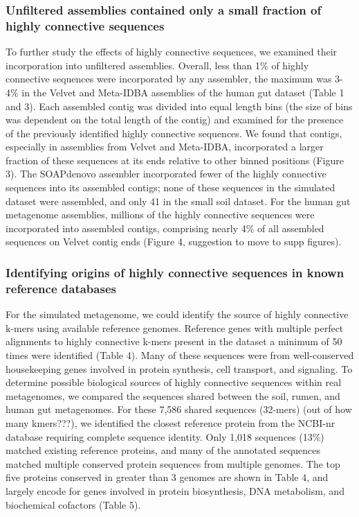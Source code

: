 \documentclass[10pt]{article}
\begin{document}
\subsubsection*{Unfiltered assemblies contained only a small fraction of highly connective sequences}
To further study the effects of highly connective sequences, we examined their incorporation into unfiltered assemblies.   Overall, less than 1\% of highly connective sequences were incorporated by any assembler, the maximum was 3-4\% in the Velvet and Meta-IDBA assemblies of the human gut dataset (Table 1 and 3).  Each assembled contig was divided into equal length bins (the size of bins was dependent on the total length of the contig) and examined for the presence of the previously identified highly connective sequences.  We found that contigs, especially in assemblies from Velvet and Meta-IDBA, incorporated a larger fraction of these sequences at its ends relative to other binned positions (Figure 3).  The SOAPdenovo assembler incorporated fewer of the highly connective sequences into its assembled contigs; none of these sequences in the simulated dataset were assembled, and only 41 in the small soil dataset.  For the human gut metagenome assemblies, millions of the highly connective sequences were incorporated into assembled contigs, comprising nearly 4\% of all assembled sequences on Velvet contig ends (Figure 4, suggestion to move to supp figures).

\subsubsection*{Identifying origins of highly connective sequences in known reference databases}

For the simulated metagenome, we could identify the source of highly connective k-mers using available reference genomes. Reference genes with multiple perfect alignments to highly connective k-mers present in the dataset a minimum of 50 times were identified (Table 4).  Many of these sequences were from well-conserved housekeeping genes involved in protein synthesis, cell transport, and signaling.  To determine possible biological sources of highly connective sequences within real metagenomes, we compared the sequences shared between the soil, rumen, and human gut metagenomes.  For these 7,586 shared sequences (32-mers) (out of how many kmers???), we identified the closest reference protein from the NCBI-nr database requiring complete sequence identity.  Only 1,018 sequences (13\%) matched existing reference proteins, and many of the annotated sequences matched multiple conserved protein sequences from multiple genomes.  The top five proteins conserved in greater than 3 genomes are shown in Table 4, and largely encode for genes involved in protein biosynthesis, DNA metabolism, and biochemical cofactors (Table 5).
\end{document}
